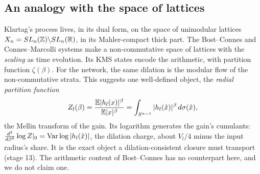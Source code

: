\subsection{An analogy with the space of lattices}
Klartag's process lives, in its dual form, on the space of unimodular lattices $X_n=SL_n(\mathbb Z)\backslash SL_n(\mathbb R)$, in its Mahler-compact thick
part. The Bost--Connes and Connes--Marcolli systems make a non-commutative space of lattices with the \emph{scaling} as time evolution.
Its KMS states encode the arithmetic, with partition function $\zeta(\beta)$. For the network, the same dilation is the modular flow of the
non-commutative strata. This suggests one well-defined object, the \emph{radial partition function}
\[
Z_l(\beta)=\frac{\mathbb E|h_l(x)|^\beta}{\mathbb E|x|^\beta}=\int_{S^{n-1}}|h_l(\hat x)|^\beta\,d\sigma(\hat x),
\]
the Mellin transform of the gain. Its logarithm generates the gain's cumulants: $\frac{d^2}{d\beta^2}\log Z|_{0}=\operatorname{Var}\log|h_l(\hat x)|$, the dilation
charge, about $V_l/4$ minus the input radius's share. It is the exact object a dilation-consistent closure must transport (stage 13).
The arithmetic content of Bost--Connes has no counterpart here, and we do not claim one.
